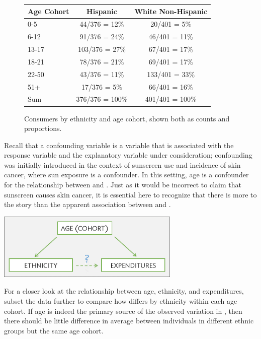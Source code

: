 \begin{figure}[ht]
	\centering
	\begin{tabular}{l|c|c}
		\hline
		Age Cohort & Hispanic & White Non-Hispanic \\ 
		\hline
		0-5 & 44/376 = 12\% & 20/401 = 5\% \\ 
		6-12 & 91/376 = 24\% & 46/401 = 11\% \\ 
		13-17 & 103/376 = 27\% & 67/401 = 17\% \\
		18-21 & 78/376 = 21\% & 69/401 = 17\% \\
		22-50 & 43/376 = 11\% & 133/401 = 33\% \\
		51+ & 17/376 = 5\% & 66/401 = 16\% \\
		\hline
		Sum & 376/376 = 100\% & 401/401 = 100\% \\ 
		\hline
	\end{tabular}
	\caption{Consumers by ethnicity and age cohort, shown both as counts and proportions.}
	\label{ddsEthAgeTable}
\end{figure}

\textD{\newpage}

Recall that a confounding variable is a variable that is associated with the response variable and the explanatory variable under consideration; confounding was initially introduced in the context of sunscreen use and incidence of skin cancer, where sun exposure is a confounder. In this setting, age is a confounder for the relationship between  and . Just as it would be incorrect to claim that sunscreen causes skin cancer, it is essential here to recognize that there is more to the story than the apparent association between  and .

\begin{center}
	\includegraphics[height=1.25in]{ch_intro_to_data_oi_biostat/figures/ddsConfounding/ddsConfounding.png}
\end{center}

For a closer look at the relationship between age, ethnicity, and expenditures, subset the data further to compare how  differs by ethnicity within each age cohort. If age is indeed the primary source of the observed variation in , then there should be little difference in average  between individuals in different ethnic groups but the same age cohort. 

